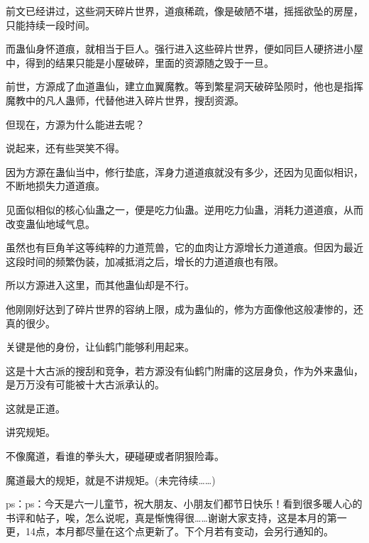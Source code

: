 \begin{this_body}
前文已经讲过，这些洞天碎片世界，道痕稀疏，像是破陋不堪，摇摇欲坠的房屋，只能持续一段时间。

而蛊仙身怀道痕，就相当于巨人。强行进入这些碎片世界，便如同巨人硬挤进小屋中，得到的结果只能是小屋破碎，里面的资源随之毁于一旦。

前世，方源成了血道蛊仙，建立血翼魔教。等到繁星洞天破碎坠陨时，他也是指挥魔教中的凡人蛊师，代替他进入碎片世界，搜刮资源。

但现在，方源为什么能进去呢？

说起来，还有些哭笑不得。

因为方源在蛊仙当中，修行垫底，浑身力道道痕就没有多少，还因为见面似相识，不断地损失力道道痕。

见面似相似的核心仙蛊之一，便是吃力仙蛊。逆用吃力仙蛊，消耗力道道痕，从而改变蛊仙地域气息。

虽然也有巨角羊这等纯粹的力道荒兽，它的血肉让方源增长力道道痕。但因为最近这段时间的频繁伪装，加减抵消之后，增长的力道道痕也有限。

所以方源进入这里，而其他蛊仙却是不行。

他刚刚好达到了碎片世界的容纳上限，成为蛊仙的，修为方面像他这般凄惨的，还真的很少。

关键是他的身份，让仙鹤门能够利用起来。

这是十大古派的搜刮和竞争，若方源没有仙鹤门附庸的这层身负，作为外来蛊仙，是万万没有可能被十大古派承认的。

这就是正道。

讲究规矩。

不像魔道，看谁的拳头大，硬碰硬或者阴狠险毒。

魔道最大的规矩，就是不讲规矩。(未完待续……)

ps：ps：今天是六一儿童节，祝大朋友、小朋友们都节日快乐！看到很多暖人心的书评和帖子，唉，怎么说呢，真是惭愧得很……谢谢大家支持，这是本月的第一更，14点，本月都尽量在这个点更新了。下个月若有变动，会另行通知的。

\end{this_body}

